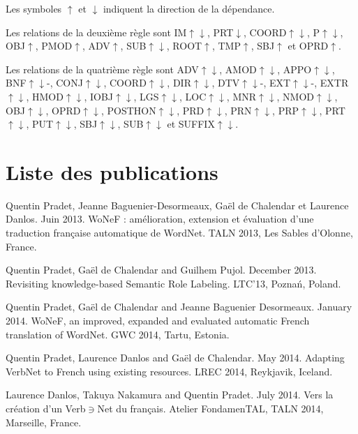 \documentclass[oneside,parskip,draft]{scrbook}
\begin{document}
Les symboles $\uparrow$ et $\downarrow$ indiquent la direction de la
dépendance.

Les relations de la deuxième règle sont IM$\uparrow\downarrow$,
PRT$\downarrow$, COORD$\uparrow\downarrow$, P$\uparrow\downarrow$,
OBJ$\uparrow$, PMOD$\uparrow$, ADV$\uparrow$, SUB$\uparrow\downarrow$,
ROOT$\uparrow$, TMP$\uparrow$, SBJ$\uparrow$ et OPRD$\uparrow$.

Les relations de la quatrième règle sont ADV$\uparrow\downarrow$,
AMOD$\uparrow\downarrow$, APPO$\uparrow\downarrow$, BNF$\uparrow\downarrow$-,
CONJ$\uparrow\downarrow$, COORD$\uparrow\downarrow$, DIR$\uparrow\downarrow$,
DTV$\uparrow\downarrow$-, EXT$\uparrow\downarrow$-, EXTR$\uparrow\downarrow$,
HMOD$\uparrow\downarrow$, IOBJ$\uparrow\downarrow$, LGS$\uparrow\downarrow$,
LOC$\uparrow\downarrow$, MNR$\uparrow\downarrow$, NMOD$\uparrow\downarrow$,
OBJ$\uparrow\downarrow$, OPRD$\uparrow\downarrow$, POSTHON$\uparrow\downarrow$,
PRD$\uparrow\downarrow$, PRN$\uparrow\downarrow$, PRP$\uparrow\downarrow$,
PRT$\uparrow\downarrow$, PUT$\uparrow\downarrow$, SBJ$\uparrow\downarrow$,
SUB$\uparrow\downarrow$ et SUFFIX$\uparrow\downarrow$.

\chapter{Liste des publications}

Quentin Pradet, Jeanne Baguenier-Desormeaux, Gaël de Chalendar et Laurence Danlos. Juin 2013. WoNeF : amélioration, extension et évaluation d’une traduction française automatique de WordNet. TALN 2013, Les Sables d'Olonne, France.

Quentin Pradet, Gaël de Chalendar and Guilhem Pujol. December 2013. Revisiting knowledge-based Semantic Role Labeling. LTC'13, Poznań, Poland.

Quentin Pradet, Gaël de Chalendar and Jeanne Baguenier Desormeaux. January 2014. WoNeF, an improved, expanded and evaluated automatic French translation of WordNet. GWC 2014, Tartu, Estonia.

Quentin Pradet, Laurence Danlos and Gaël de Chalendar. May 2014. Adapting VerbNet to French using existing resources. LREC 2014, Reykjavik, Iceland.

Laurence Danlos, Takuya Nakamura and Quentin Pradet. July 2014. Vers la création d’un Verb$\ni$Net du français. Atelier FondamenTAL, TALN 2014, Marseille, France.


\printglossary
\end{document}
